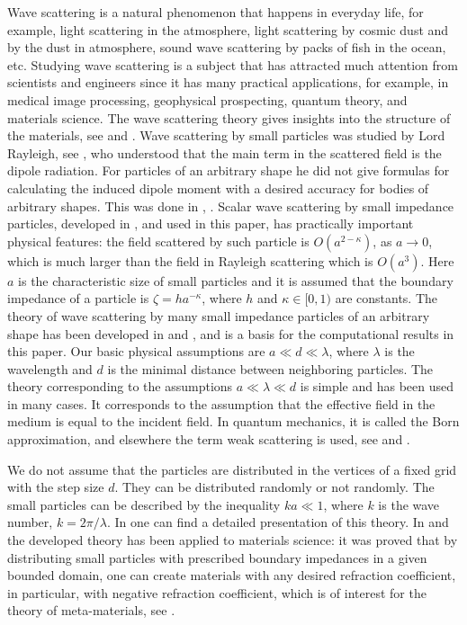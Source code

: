 \documentclass{wap}
\makeatletter
\let\sectionorig\section
\def\@sectionorig#1{\sectionorig*{\MakeUppercase{#1}}}
\def\@@sectionorig#1{\sectionorig{\MakeUppercase{#1}}}
\renewcommand{\section}{\@ifstar{\@sectionorig}{\@@sectionorig}}
\makeatother
\begin{document}
\section{\textsc{INTRODUCTION}}
\hspace*{\parindent}Wave scattering is a natural phenomenon that happens in everyday life, for example, light scattering in the atmosphere, light scattering by cosmic dust and by the dust in atmosphere, sound wave scattering by packs of fish in the ocean, etc.
Studying wave scattering is a subject that has attracted much attention from scientists and engineers since it has many practical applications, for example, in  medical image processing,  geophysical prospecting, quantum theory, and materials science.
The wave scattering theory gives insights into the structure of the materials, see \cite{R278} and \cite{R470}. Wave scattering by small particles was studied by Lord Rayleigh, see \cite{Ray}, who understood that the main term in the scattered field is the dipole radiation. For particles of an arbitrary shape he did not give formulas for calculating the induced dipole moment with a desired accuracy for bodies of arbitrary shapes. This was done in \cite{R57}, \cite{R476}. Scalar wave scattering by small impedance particles, developed in \cite{R635}, and used in this paper, has practically important physical features:
the field scattered by such particle is $O(a^{2-\kappa})$, as $a\to 0$, which is  much larger than the field in Rayleigh scattering which is $O(a^3)$. Here $a$ is the characteristic size of small particles and it is assumed that the boundary impedance of a particle is $\zeta=ha^{-\kappa}$, where $h$ and $\kappa\in [0,1)$ are constants. The theory of wave scattering by many small impedance particles of an arbitrary shape has been developed in \cite{R632} and \cite{R635}, and is a basis for the computational results in this paper. Our basic physical assumptions are $a\ll d\ll \lambda$, where $\lambda$ is the wavelength and   $d$ is  the minimal distance between neighboring particles. The theory corresponding to the assumptions $a\ll \lambda\ll d$   is simple and has been used in many cases. It corresponds to the assumption that the effective field in the medium is equal to the incident field. In quantum mechanics, it is called the Born approximation, and elsewhere the term weak scattering is used, see \cite{R278} and \cite{R470}.

We do not assume that the particles are distributed in the vertices of a fixed grid with the step size $d$. They can be distributed randomly or not randomly. The small particles can be described by the inequality $ka\ll 1$, where $k$ is the wave number, $k=2\pi/\lambda$.
In \cite{R635} one can find a detailed presentation of this theory.
In \cite{R632} and \cite{R635} the developed theory has been applied to materials science: it
was proved that by distributing  small particles with  prescribed boundary impedances in a given bounded domain, one can create materials with any desired refraction coefficient, in particular, with negative refraction coefficient, which is of interest for the theory of meta-materials, see \cite{EB2005}.
\end{document}
